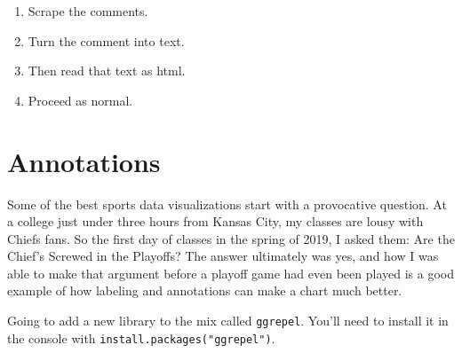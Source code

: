 \documentclass[]{book}
\newenvironment{Shaded}{\begin{snugshade}}{\end{snugshade}}
\newcommand{\KeywordTok}[1]{\textcolor[rgb]{0.13,0.29,0.53}{\textbf{#1}}}
\newcommand{\DataTypeTok}[1]{\textcolor[rgb]{0.13,0.29,0.53}{#1}}
\newcommand{\StringTok}[1]{\textcolor[rgb]{0.31,0.60,0.02}{#1}}
\newcommand{\CommentTok}[1]{\textcolor[rgb]{0.56,0.35,0.01}{\textit{#1}}}
\newcommand{\OperatorTok}[1]{\textcolor[rgb]{0.81,0.36,0.00}{\textbf{#1}}}
\newcommand{\NormalTok}[1]{#1}
\providecommand{\tightlist}{%
  \setlength{\itemsep}{0pt}\setlength{\parskip}{0pt}}
\begin{document}
\begin{enumerate}
\def\labelenumi{\arabic{enumi}.}
\tightlist
\item
  Scrape the comments.
\item
  Turn the comment into text.
\item
  Then read that text as html.
\item
  Proceed as normal.
\end{enumerate}

\begin{Shaded}
\end{Shaded}

\chapter{Annotations}\label{annotations}

Some of the best sports data visualizations start with a provocative
question. At a college just under three hours from Kansas City, my
classes are lousy with Chiefs fans. So the first day of classes in the
spring of 2019, I asked them: Are the Chief's Screwed in the Playoffs?
The answer ultimately was yes, and how I was able to make that argument
before a playoff game had even been played is a good example of how
labeling and annotations can make a chart much better.

Going to add a new library to the mix called \texttt{ggrepel}. You'll
need to install it in the console with
\texttt{install.packages("ggrepel")}.
\end{document}
